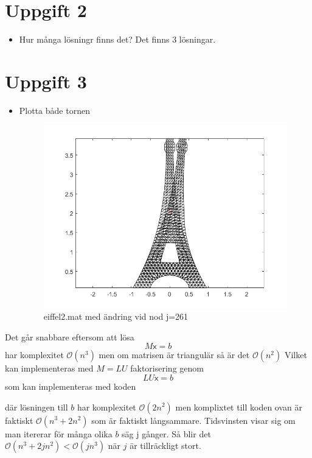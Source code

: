 \documentclass{assignment}
\begin{document}
\newpage
\section*{Uppgift 2}
\begin{itemize}
    \item Hur många lösningr finns det? Det finns 3 lösningar.
\end{itemize}

\section*{Uppgift 3}

\begin{itemize}
    \item Plotta både tornen
    \\
    \begin{figure}[!h]
        \caption{eiffel2.mat med ändring vid nod j=261}
        \centering
        \includegraphics{assets/tornen.png}
    \end{figure}
\end{itemize}
Det går snabbare eftersom att lösa 
\[ M\mathsf{x}=b \] har komplexitet $\mathcal{O}(n^3)$
men om matrisen är triangulär så är det $\mathcal{O}(n^2)$
Vilket kan implementeras med $M=LU$ faktorisering
genom 
\[LU\mathsf{x}=b\]
som kan implementeras med koden 


där lösningen till $b$ har komplexitet $\mathcal{O}(2n^2)$
men komplixtet till koden ovan är faktiskt $\mathcal{O}(n^3+2n^2)$ som är faktiskt långsammare.
Tidsvinsten visar sig om man itererar för många olika $b$ säg j gånger.
Så blir det $\mathcal{O}(n^3+2jn^2) < \mathcal{O}(jn^3)$ när $j$ är tillräckligt stort.
\end{document}
